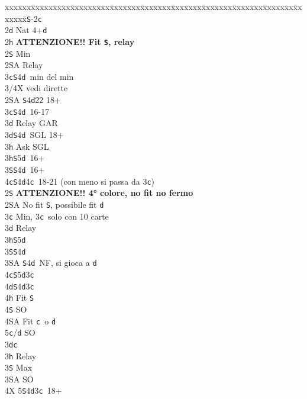 \documentclass[a4paper,italian]{article}
\newcommand{\BS}{\small{\texttt{S}}}
\newcommand{\BC}{\small{\texttt{c}}}
\newcommand{\BD}{\small{\texttt{d}}}
\newcommand{\BH}{\small{\texttt{h}}}
\newenvironment{bidtable}
{\begin{tabbing}

    xxxxxx\=xxxxxxxxx\=xxxxxxxxx\=xxxxxxx\=xxxxxxx\=xxxxxxx\=xxxxxxx\=xxxxxxx\=xxxxxxx\=xxxxxxx\=\kill}
{\end{tabbing} }%
\begin{document}
\begin{multicols}{2}
    \begin{bidtable}
        1\BS-2\BC\\
        2\BD \> Nat 4+\BD \+\\
        2\BH \> \textbf{ATTENZIONE!! Fit \BS , relay}\+\\
        2\BS \> Min\+\\
        2\small{SA} \> Relay\+\\
        3\BC {}\BS 4\BD\ min del min\\
        3/4X \> vedi dirette\-\-\\
        2\small{SA} \BS 4\BD 22 18+\\
        3\BC {}\BS 4\BD\ 16-17\+\\
        3\BD \> Relay GAR\-\\
        3\BD {}\BS 4\BD\ SGL 18+\+\\
        3\BH \> Ask SGL\-\\
        3\BH {}\BS 5\BD\ 16+\\
        3\BS {}\BS 4\BD\ 16+\\
        4\BC {}\BS 4\BD 4\BC\ 18-21 (con meno si passa da 3\BC )\-\\
        2\BS \> \textbf{ATTENZIONE!! 4° colore, no fit no fermo}\\
        2\small{SA} \> No fit \BS , possibile fit \BD\+\\
        3\BC \> Min, 3\BC\ solo con 10 carte\+\\
        3\BD \> Relay\+\\
        3\BH {}\BS 5\BD \\
        3\BS {}\BS 4\BD \\
        3\small{SA} \BS 4\BD\ NF, si gioca a \BD \\
        4\BC {}\BS 5\BD 3\BC \\
        4\BD {}\BS 4\BD 3\BC \+\\
        4\BH \> Fit \BS\\
        4\BS \> SO \\
        4\small{SA} \> Fit \BC\ o \BD \\
        5\BC/\BD \> SO\-\-\-\\
        3\BD {}\BC \+\\
        3\BH \> Relay\+\\
        3\BS \> Max\+\\
        3\small{SA} \> SO\+\\
        4X 5\BS 4\BD 3\BC\ 18+\-\-\\

\end{bidtable}
\end{multicols}
\end{document}
